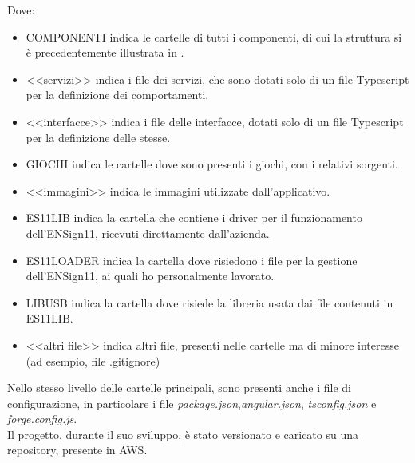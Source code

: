 Dove:
\begin{itemize}
    \item COMPONENTI indica le cartelle di tutti i componenti, di cui la struttura si è precedentemente illustrata in .
    \item <<servizi>> indica i file dei servizi, che sono dotati solo di un file Typescript per la definizione dei comportamenti.
    \item <<interfacce>> indica i file delle interfacce, dotati solo di un file Typescript per la definizione delle stesse.
    \item GIOCHI indica le cartelle dove sono presenti i giochi, con i relativi sorgenti.
    \item <<immagini>> indica le immagini utilizzate dall'applicativo.
    \item ES11LIB indica la cartella che contiene i driver per il funzionamento dell'ENSign11, ricevuti direttamente dall'azienda.
    \item ES11LOADER indica la cartella dove risiedono i file per la gestione dell'ENSign11, ai quali ho personalmente lavorato.
    \item LIBUSB indica la cartella dove risiede la libreria usata dai file contenuti in ES11LIB.
    \item <<altri file>> indica altri file, presenti nelle cartelle ma di minore interesse (ad esempio, file .gitignore)
\end{itemize}
Nello stesso livello delle cartelle principali, sono presenti anche i file di configurazione, in particolare i file \emph{package.json},\emph{angular.json}, \emph{tsconfig.json} e \emph{forge.config.js}.\\
Il progetto, durante il suo sviluppo, è stato versionato e caricato su una repository, presente in AWS.
